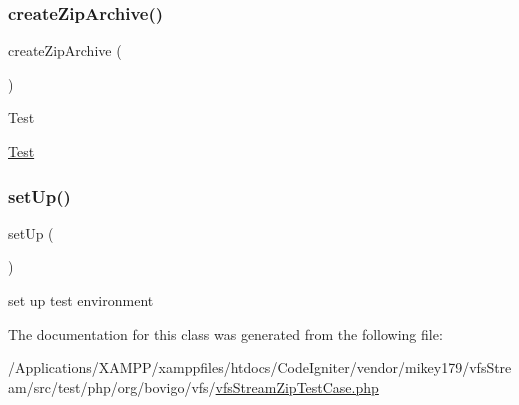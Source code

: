 \subsubsection{\texorpdfstring{create\+Zip\+Archive()}{createZipArchive()}}
{\footnotesize\ttfamily create\+Zip\+Archive (\begin{DoxyParamCaption}{ }\end{DoxyParamCaption})}

\begin{DoxyRefDesc}{Test}
\item[\mbox{\hyperlink{test__test000290}{Test}}]\end{DoxyRefDesc}
\mbox{\label{classorg_1_1bovigo_1_1vfs_1_1vfs_stream_zip_test_case_a0bc688732d2b3b162ffebaf7812e78da}} 
\subsubsection{\texorpdfstring{set\+Up()}{setUp()}}
{\footnotesize\ttfamily set\+Up (\begin{DoxyParamCaption}{ }\end{DoxyParamCaption})}

set up test environment 

The documentation for this class was generated from the following file\+:\begin{DoxyCompactItemize}
\item 
/\+Applications/\+X\+A\+M\+P\+P/xamppfiles/htdocs/\+Code\+Igniter/vendor/mikey179/vfs\+Stream/src/test/php/org/bovigo/vfs/\mbox{\hyperlink{vfs_stream_zip_test_case_8php}{vfs\+Stream\+Zip\+Test\+Case.\+php}}\end{DoxyCompactItemize}
